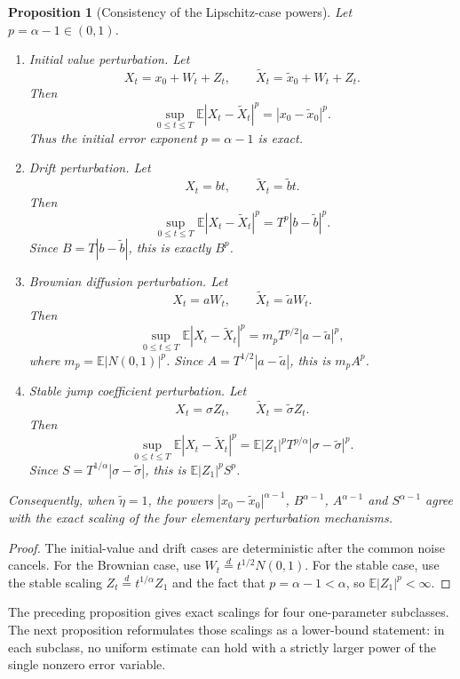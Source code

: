 \documentclass[11pt]{article}
\newtheorem{proposition}[theorem]{Proposition}
\newcommand{\E}{\mathbb{E}}
\newcommand{\1}{\mathbf{1}}
\newcommand{\wt}{\tilde}
\begin{document}
\begin{proposition}[Consistency of the Lipschitz-case powers]
\label{prop:constant-consistency}
Let $p=\alpha-1\in(0,1)$.
\begin{enumerate}[label=\textup{(\roman*)}]
\item \textup{Initial value perturbation.} Let
\[
  X_t=x_0+W_t+Z_t,
  \qquad
  \wt X_t=\wt x_0+W_t+Z_t.
\]
Then
\[
  \sup_{0\le t\le T}\E|X_t-\wt X_t|^p=|x_0-\wt x_0|^p.
\]
Thus the initial error exponent $p=\alpha-1$ is exact.

\item \textup{Drift perturbation.} Let
\[
  X_t=bt,
  \qquad
  \wt X_t=\wt b t.
\]
Then
\[
  \sup_{0\le t\le T}\E|X_t-\wt X_t|^p=T^p|b-\wt b|^p.
\]
Since $B=T|b-\wt b|$, this is exactly $B^p$.

\item \textup{Brownian diffusion perturbation.} Let
\[
  X_t=aW_t,
  \qquad
  \wt X_t=\wt a W_t.
\]
Then
\[
  \sup_{0\le t\le T}\E|X_t-\wt X_t|^p
  =m_p T^{p/2}|a-\wt a|^p,
\]
where $m_p=\E|N(0,1)|^p$. Since $A=T^{1/2}|a-\wt a|$, this is $m_p A^p$.

\item \textup{Stable jump coefficient perturbation.} Let
\[
  X_t=\sigma Z_t,
  \qquad
  \wt X_t=\wt\sigma Z_t.
\]
Then
\[
  \sup_{0\le t\le T}\E|X_t-\wt X_t|^p
  =\E|Z_1|^p T^{p/\alpha}|\sigma-\wt\sigma|^p.
\]
Since $S=T^{1/\alpha}|\sigma-\wt\sigma|$, this is $\E|Z_1|^pS^p$.
\end{enumerate}
Consequently, when $\wt\eta=1$, the powers $|x_0-\wt x_0|^{\alpha-1}$, $B^{\alpha-1}$, $A^{\alpha-1}$ and $S^{\alpha-1}$ agree with the exact scaling of the four elementary perturbation mechanisms.
\end{proposition}

\begin{proof}
The initial-value and drift cases are deterministic after the common noise cancels. For the Brownian case, use $W_t\stackrel{d}{=}t^{1/2}N(0,1)$. For the stable case, use the stable scaling $Z_t\stackrel{d}{=}t^{1/\alpha}Z_1$ and the fact that $p=\alpha-1<\alpha$, so $\E|Z_1|^p<\infty$.
\end{proof}

The preceding proposition gives exact scalings for four one-parameter subclasses. The next proposition reformulates those scalings as a lower-bound statement: in each subclass, no uniform estimate can hold with a strictly larger power of the single nonzero error variable.
\end{document}
